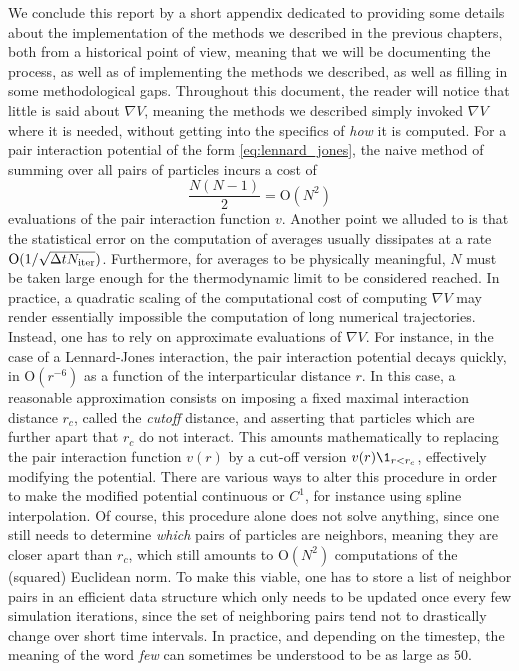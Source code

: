 We conclude this report by a short appendix dedicated to providing some details about the implementation of the methods we described in the previous chapters,
both from a historical point of view, meaning that we will be documenting the process, as well as of implementing the methods we described, as well as filling in some methodological gaps.
Throughout this document, the reader will notice that little is said about $\nabla V$, meaning the methods we described simply invoked $\nabla V$ where it is needed, 
without getting into the specifics of \textit{how} it is computed.
For a pair interaction potential of the form \eqref{eq:lennard_jones}, the naive method of summing over all pairs of particles incurs a cost of
\[\frac{N(N-1)}2 =\mathrm{O}(N^2)\]
evaluations of the pair interaction function $v$.
Another point we alluded to is that the statistical error on the computation of averages usually dissipates at a rate $\mathrm{O}(1/\sqrt{{\Delta t} N_{\mathrm{iter}}})$.
Furthermore, for averages to be physically meaningful, $N$ must be taken large enough for the thermodynamic limit to be considered reached.
In practice, a quadratic scaling of the computational cost of computing $\nabla V$ may render essentially impossible the computation of long numerical trajectories.
Instead, one has to rely on approximate evaluations of $\nabla V$. For instance, in the case of a Lennard-Jones interaction, the pair interaction potential decays quickly, in $\mathrm{O}(r^{-6})$ as a function of the interparticular distance $r$.
In this case, a reasonable approximation consists on imposing a fixed maximal interaction distance $r_c$, called the \textit{cutoff} distance, and asserting that particles which are further apart that $r_c$ do not interact.
This amounts mathematically to replacing the pair interaction function $v(r)$ by a cut-off version $v(r)\1_{r<r_c}$, effectively modifying the potential.
There are various ways to alter this procedure in order to make the modified potential continuous or $C^1$, for instance using spline interpolation. 
Of course, this procedure alone does not solve anything, since one still needs to determine \textit{which} pairs of particles are neighbors, meaning they are closer apart than $r_c$, which still amounts to $\mathrm{O}(N^2)$ computations of the (squared) Euclidean norm.
To make this viable, one has to store a list of neighbor pairs in an efficient data structure which only needs to be updated once every few simulation iterations, since the set of neighboring pairs tend not to drastically change over short time intervals.
In practice, and depending on the timestep, the meaning of the word \textit{few} can sometimes be understood to be as large as $50$.
